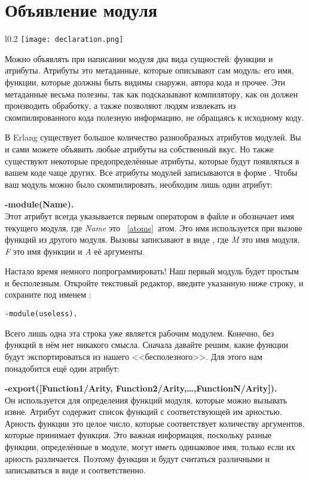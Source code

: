 \section{Объявление модуля}
\begin{wrapfigure}{l}{0.2\linewidth}
    \texttt{[image: declaration.png]}
\end{wrapfigure}
Можно объявлять при написании модуля два вида сущностей: функции и атрибуты.
Атрибуты это метаданные, которые описывают сам модуль: его имя, функции, которые должны быть видимы снаружи, автора кода и прочее.
Эти метаданные весьма полезны, так как подсказывают компилятору, как он должен производить обработку, а также позволяют людям извлекать из скомпилированного кода полезную информацию, не обращаясь к исходному коду.

В Erlang существует большое количество разнообразных атрибутов модулей.
Вы и сами можете объявить любые атрибуты на собственный вкус.
Но также существуют некоторые предопределённые атрибуты, которые будут появляться в вашем коде чаще других.
Все атрибуты модулей записываются в форме .
Чтобы ваш модуль можно было скомпилировать, необходим лишь один атрибут:

\begin{minipage}{1\linewidth}
    \textbf{-module(Name).}\\ 
    Этот атрибут всегда указывается первым оператором в файле и обозначает имя текущего модуля, где \emph{Name} это ~\ref{atoms}~атом.
    Это имя используется при вызове функций из другого модуля.
    Вызовы записывают в виде , где \emph{M} это имя модуля, \emph{F} это имя функции и \emph{A} её аргументы.
\end{minipage}

Настало время немного попрограммировать!
Наш первый модуль будет простым и бесполезным.
Откройте текстовый редактор, введите указанную ниже строку, и сохраните под именем :
\begin{lstlisting}[style=repl]
-module(useless).
\end{lstlisting}

Всего лишь одна эта строка уже является рабочим модулем.
Конечно, без функций в нём нет никакого смысла.
Сначала давайте решим, какие функции будут экспортироваться из нашего <<бесполезного>>.
Для этого нам понадобится ещё один атрибут:

\begin{minipage}{1.0\linewidth}
    \textbf{-export([Function1/Arity, Function2/Arity,\ldots,FunctionN/Arity]).}\\ 
    Он используется для определения функций модуля, которые можно вызывать извне.
    Атрибут содержит список функций с соответствующей им арностью.
    Арность функции это целое число, которые соответствует количеству аргументов, которые принимает функция.
    Это важная информация, поскольку разные функции, определённые в модуле, могут иметь одинаковое имя, только если их арность различается.
    Поэтому функции  и  будут считаться различными и записываться в виде  и  соответственно.
\end{minipage}


